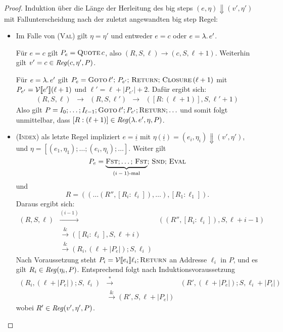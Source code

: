 \documentclass[12pt,fleqn]{article}
\newcommand{\RN}[1]{\mbox{\textsc{(#1)}}}
\begin{document}
\begin{proof}
  Induktion \"uber die L\"ange der Herleitung des big steps $(e,\eta) \Downarrow (v',\eta')$ mit Fallunterscheidung
  nach der zuletzt angewandten big step Regel:
  \begin{itemize}
  \item Im Falle von \RN{Val} gilt $\eta=\eta'$ und entweder $e = c$ oder $e = \lambda .\,e'$.

    F\"ur $e = c$ gilt $P_e = \textsc{Quote}\,c$, also
    $(R,S,\ell) \to (c,S,\ell+1)$. Weiterhin gilt $v' = c \in {\text{\it Reg\/}}(c,\eta',P)$.

    F\"ur $e = \lambda .\,e'$ gilt $P_e = \textsc{Goto}\,\ell';\,P_{e'};\,\textsc{Return};\,\textsc{Closure}\,(\ell+1)$
    mit $P_{e'} = \mathcal{V}\llbracket e' \rrbracket(\ell+1)$ und $\ell' = \ell + |P_{e'}| + 2$. Daf\"ur ergibt sich:
    \[\begin{array}{rcccl}
      (R,S,\ell) &\to& (R,S,\ell') &\to& ([R:(\ell+1)],S,\ell'+1)
    \end{array}\]
    Also gilt $P = I_0;\ldots;I_{\ell-1};\textsc{Goto}\,\ell';P_{e'};\textsc{Return};\ldots$ und somit folgt
    unmittelbar, dass $[R:(\ell+1)]\in{\text{\it Reg\/}}(\lambda .\,e',\eta,P)$.

  \item \RN{Index} als letzte Regel impliziert $e = \underline{i}$ mit
    $\eta(\underline{i}) = (e_i,\eta_i) \Downarrow (v',\eta')$, und $\eta = [(e_1,\eta_1);\ldots;(e_i,\eta_i);\ldots]$.
    Weiter gilt
    \[P_e = \underbrace{\textsc{Fst};\ldots;\,\textsc{Fst}}_{\text{$(i-1)$-mal}};\,\textsc{Snd};\,\textsc{Eval}\]
    und
    \[R = ((\ldots(R'',[R_i:\ell_i]),\ldots),[R_1:\ell_1]).\]
    Daraus ergibt sich:
    \[\begin{array}{rcl}
      (R,S,\ell)
      &\xrightarrow{(i-1)}& ((R'',[R_i:\ell_i]),S,\ell+i-1) \\
      &\xrightarrow& ([R_i:\ell_i],S,\ell+i) \\
      &\xrightarrow& (R_i,(\ell+|P_e|);S,\ell_i)
    \end{array}\]
    Nach Voraussetzung steht $P_i=\mathcal{V}\llbracket e_i \rrbracket\ell_i;\textsc{Return}$ an Addresse $\ell_i$ in $P$, und
    es gilt $R_i \in {\text{\it Reg\/}}(\eta_i,P)$. Entsprechend folgt nach Induktionsvoraussetzung
    \[\begin{array}{rcl}
      (R_i,(\ell+|P_e|);S,\ell_i)
      &\xrightarrow*& (R',(\ell+|P_e|);S,\ell_i+|P_i|) \\
      &\xrightarrow& (R',S,\ell+|P_e|)
    \end{array}\]
    wobei $R'\in{\text{\it Reg\/}}(v',\eta',P)$.


\end{itemize}
\end{proof}
\end{document}
